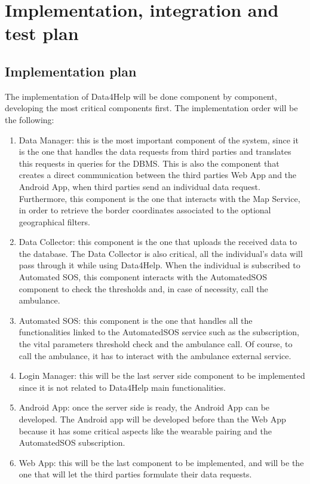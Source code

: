\chapter{Implementation, integration and test plan}
\section{Implementation plan}
The implementation of Data4Help will be done component by component, developing the most critical components first.
The implementation order will be the following:
\begin{enumerate}
\item Data Manager: this is the most important component of the system, since it is the one that handles the data requests from third parties and translates this requests in queries for the DBMS. 
This is also the component that creates a direct communication between the third parties Web App and the Android App, when third parties send an individual data request.\\
Furthermore, this component is the one that interacts with the Map Service, in order to retrieve the border coordinates associated to the optional geographical filters.
\item Data Collector: this component is the one that uploads the received data to the database. The Data Collector is also critical, all the individual's data will pass through it while using Data4Help. 
When the individual is subscribed to Automated SOS, this component interacts with the AutomatedSOS component to check the thresholds and, in case of necessity, call the ambulance.
\item Automated SOS: this component is the one that handles all the functionalities linked to the AutomatedSOS service such as the subscription, the vital parameters threshold check and the ambulance call. Of course, to call the ambulance, it has to interact with the ambulance external service.
\item Login Manager: this will be the last server side component to be implemented since it is not related to Data4Help main functionalities.
\item Android App: once the server side is ready, the Android App can be developed. The Android app will be developed before than the Web App because it has some critical aspects like the wearable pairing and the AutomatedSOS subscription.
\item Web App: this will be the last component to be implemented, and will be the one that will let the third parties formulate their data requests.
\end{enumerate}

